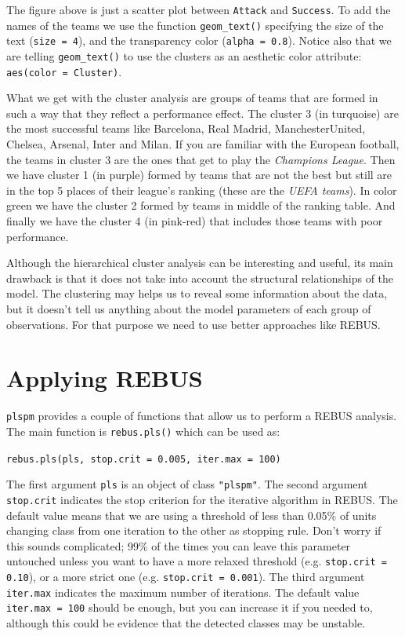 \documentclass[12pt]{book}\usepackage{graphicx, color}
\newcommand{\plspm}{\texttt{plspm}}
\newcommand{\code}[1]{\texttt{#1}}
\begin{document}
The figure above is just a scatter plot between \code{Attack} and \code{Success}. To add the names of the teams we use the function \code{geom\_text()} specifying the size of the text (\code{size = 4}), and the transparency color (\code{alpha = 0.8}). Notice also that we are telling \code{geom\_text()} to use the clusters as an aesthetic color attribute: \code{aes(color = Cluster)}.

What we get with the cluster analysis are groups of teams that are formed in such a way that they reflect a performance effect. The cluster 3 (in turquoise) are the most successful teams like Barcelona, Real Madrid, ManchesterUnited, Chelsea, Arsenal, Inter and Milan. If you are familiar with the European football, the teams in cluster 3 are the ones that get to play the \textit{Champions League}. Then we have cluster 1 (in purple) formed by teams that are not the best but still are in the top 5 places of their league's ranking (these are the \textit{UEFA teams}). In color green we have the cluster 2 formed by teams in middle of the ranking table. And finally we have the cluster 4 (in pink-red) that includes those teams with poor performance.

Although the hierarchical cluster analysis can be interesting and useful, its main drawback is that it does not take into account the structural relationships of the model. The clustering may helps us to reveal some information about the data, but it doesn't tell us anything about the model parameters of each group of observations. For that purpose we need to use better approaches like REBUS.




\section{Applying REBUS}
\plspm{} provides a couple of functions that allow us to perform a REBUS analysis. The main function is \code{rebus.pls()} which can be used as:

\texttt{rebus.pls(pls, stop.crit = 0.005, iter.max = 100)}

The first argument \code{pls} is an object of class \code{"plspm"}. The second argument \code{stop.crit} indicates the stop criterion for the iterative algorithm in REBUS. The default value means that we are using a threshold of less than 0.05\% of units changing class from one iteration to the other as stopping rule. Don't worry if this sounds complicated; 99\% of the times you can leave this parameter untouched unless you want to have a more relaxed threshold (e.g. \code{stop.crit = 0.10}), or a more strict one (e.g. \code{stop.crit = 0.001}). The third argument \code{iter.max} indicates the maximum number of iterations. The default value \code{iter.max = 100} should be enough, but you can increase it if you needed to, although this could be evidence that the detected classes may be unstable.
\end{document}
